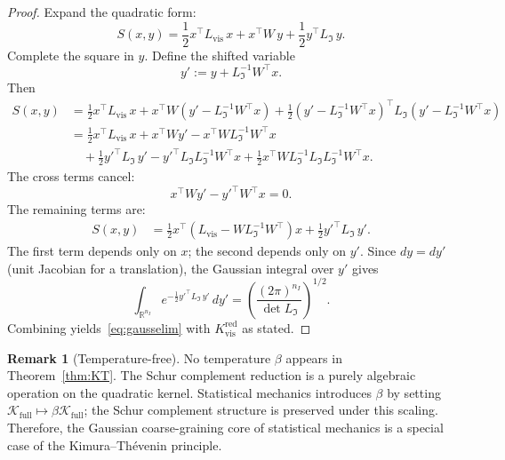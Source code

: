 \documentclass[12pt]{article}
\theoremstyle{plain}
\theoremstyle{definition}
\newtheorem{remark}[theorem]{Remark}
\numberwithin{equation}{section}
\newcommand{\R}{\mathbb{R}}
\newcommand{\vis}{\mathrm{vis}}
\newcommand{\red}{\mathrm{red}}
\newcommand{\fI}{\mathfrak{I}}
\begin{document}
\begin{proof}
Expand the quadratic form:
\begin{equation}
S(x,y) = \frac{1}{2}x^\top L_{\vis}\,x
+ x^\top W\,y
+ \frac{1}{2}y^\top L_{\fI}\,y.
\end{equation}
Complete the square in $y$.  Define the shifted variable
\begin{equation}
y' := y + L_{\fI}^{-1}W^\top x.
\end{equation}
Then
\begin{align}
S(x,y) &= \frac{1}{2}x^\top L_{\vis}\,x
+ x^\top W(y'-L_{\fI}^{-1}W^\top x)
+ \frac{1}{2}(y'-L_{\fI}^{-1}W^\top x)^\top L_{\fI}
(y'-L_{\fI}^{-1}W^\top x)\\
&= \frac{1}{2}x^\top L_{\vis}\,x
+ x^\top Wy' - x^\top WL_{\fI}^{-1}W^\top x\\
&\quad + \frac{1}{2}y'^\top L_{\fI}\,y'
- y'^\top L_{\fI}L_{\fI}^{-1}W^\top x
+ \frac{1}{2}x^\top WL_{\fI}^{-1}L_{\fI}L_{\fI}^{-1}W^\top x.
\end{align}
The cross terms cancel:
\begin{equation}
x^\top Wy' - y'^\top W^\top x = 0.
\end{equation}
The remaining terms are:
\begin{align}
S(x,y) &= \frac{1}{2}x^\top\!\left(L_{\vis}-WL_{\fI}^{-1}W^\top\right)x
+ \frac{1}{2}y'^\top L_{\fI}\,y'.
\end{align}
The first term depends only on $x$; the second depends only on $y'$.
Since $dy=dy'$ (unit Jacobian for a translation), the Gaussian integral
over $y'$ gives
\begin{equation}
\int_{\R^{n_I}} e^{-\frac{1}{2}y'^\top L_{\fI}\,y'}\,dy'
= \left(\frac{(2\pi)^{n_I}}{\det L_{\fI}}\right)^{1/2}.
\end{equation}
Combining yields~\eqref{eq:gausselim} with $K_{\vis}^{\red}$ as stated.
\end{proof}

\begin{remark}[Temperature-free]
No temperature $\beta$ appears in Theorem~\ref{thm:KT}.  The Schur
complement reduction is a purely algebraic operation on the quadratic
kernel.  Statistical mechanics introduces $\beta$ by setting
$\mathcal{K}_{\mathrm{full}}\mapsto\beta\mathcal{K}_{\mathrm{full}}$;
the Schur complement structure is preserved under this scaling.
Therefore, the Gaussian coarse-graining core of statistical mechanics
is a special case of the Kimura--Th\'evenin principle.
\end{remark}
\end{document}
